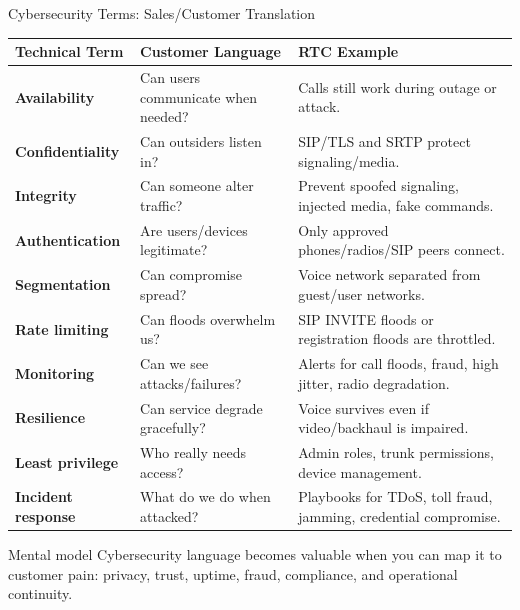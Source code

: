 \documentclass[aspectratio=169]{beamer}
\begin{document}
\begin{frame}{Cybersecurity Terms: Sales/Customer Translation}
\tiny
\begin{tabular}{p{3.0cm} p{4.0cm} p{5.0cm}}
\toprule
\textbf{Technical Term} & \textbf{Customer Language} & \textbf{RTC Example} \\
\midrule
\textbf{Availability} & Can users communicate when needed? & Calls still work during outage or attack. \\
\textbf{Confidentiality} & Can outsiders listen in? & SIP/TLS and SRTP protect signaling/media. \\
\textbf{Integrity} & Can someone alter traffic? & Prevent spoofed signaling, injected media, fake commands. \\
\textbf{Authentication} & Are users/devices legitimate? & Only approved phones/radios/SIP peers connect. \\
\textbf{Segmentation} & Can compromise spread? & Voice network separated from guest/user networks. \\
\textbf{Rate limiting} & Can floods overwhelm us? & SIP INVITE floods or registration floods are throttled. \\
\textbf{Monitoring} & Can we see attacks/failures? & Alerts for call floods, fraud, high jitter, radio degradation. \\
\textbf{Resilience} & Can service degrade gracefully? & Voice survives even if video/backhaul is impaired. \\
\textbf{Least privilege} & Who really needs access? & Admin roles, trunk permissions, device management. \\
\textbf{Incident response} & What do we do when attacked? & Playbooks for TDoS, toll fraud, jamming, credential compromise. \\
\bottomrule
\end{tabular}

\vspace{0.15cm}
\begin{block}{Mental model}
Cybersecurity language becomes valuable when you can map it to customer pain: privacy, trust, uptime, fraud, compliance, and operational continuity.
\end{block}
\end{frame}
\end{document}
